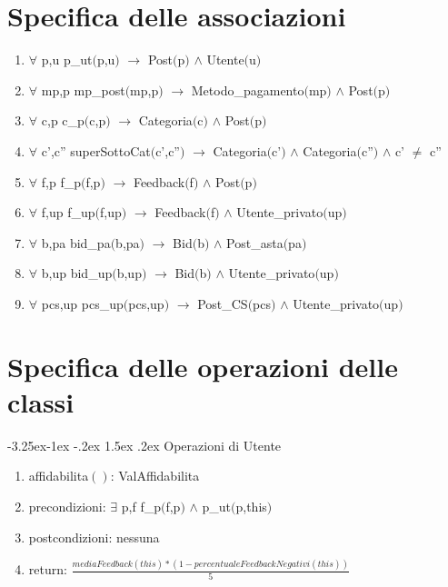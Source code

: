 \documentclass{article}
\makeatletter
\renewcommand\subsection{\@startsection{subsection}{2}{\z@}%
                                     {-3.25ex\@plus-1ex \@minus-.2ex}%
                                     {1.5ex \@plus.2ex}%
                                     {\normalfont\normalsize\bfseries}}
\makeatother
\begin{document}
\newpage
\section{\label{sec:SpecificaAssociazioni}Specifica delle associazioni}
\begin{enumerate}
    \item $\forall$ p,u p\_ut$($p,u$)$ $\rightarrow$ Post$($p$)$ $\land$ Utente$($u$)$
    \item $\forall$ mp,p mp\_post$($mp,p$)$ $\rightarrow$ Metodo\_pagamento$($mp$)$ $\land$ Post$($p$)$
    \item $\forall$ c,p c\_p$($c,p$)$ $\rightarrow$ Categoria$($c$)$ $\land$ Post$($p$)$
    \item $\forall$ c',c'' superSottoCat$($c',c''$)$ $\rightarrow$ Categoria$($c'$)$ $\land$ Categoria$($c''$)$ $\land$ c' $\neq$ c''
    \item $\forall$ f,p f\_p$($f,p$)$ $\rightarrow$ Feedback$($f$)$ $\land$ Post$($p$)$
    \item $\forall$ f,up f\_up$($f,up$)$ $\rightarrow$ Feedback$($f$)$ $\land$ Utente\_privato$($up$)$
    \item $\forall$ b,pa bid\_pa$($b,pa$)$ $\rightarrow$ Bid$($b$)$ $\land$ Post\_asta$($pa$)$
    \item $\forall$ b,up bid\_up$($b,up$)$ $\rightarrow$ Bid$($b$)$ $\land$ Utente\_privato$($up$)$
    \item $\forall$ pcs,up pcs\_up$($pcs,up$)$ $\rightarrow$ Post\_CS$($pcs$)$ $\land$ Utente\_privato$($up$)$
\end{enumerate}

\newpage
\section{\label{sec:SpecificaOperazioniClassi}Specifica delle operazioni delle classi}

\subsection{\label{sec:OperazioniUtente}Operazioni di Utente}

\begin{enumerate}
    \item\label{sec:OperazioniUtenteAffidabilita}affidabilita$()$: ValAffidabilita
    \item precondizioni: $\exists$ p,f f\_p$($f,p$)$ $\land$ p\_ut$($p,this$)$
    \item postcondizioni: nessuna
    \item return: $\frac{mediaFeedback(this) * (1 - percentualeFeedbackNegativi(this))}{5}$
\end{enumerate}
\end{document}
